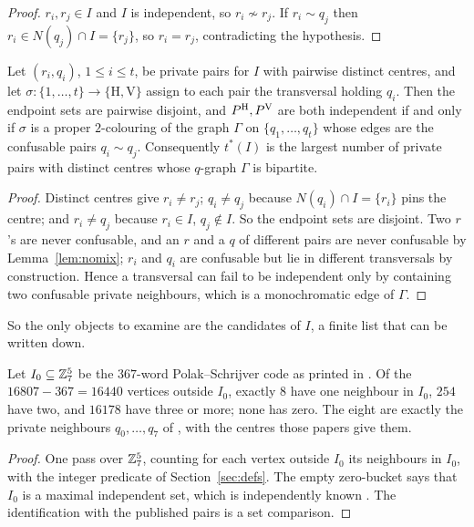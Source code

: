 \begin{proof}
$r_i,r_j\in I$ and $I$ is independent, so $r_i\not\sim r_j$. If $r_i\sim q_j$ then
$r_i\in N(q_j)\cap I=\{r_j\}$, so $r_i=r_j$, contradicting the hypothesis.
\end{proof}

\begin{corollary}[proved]
\label{cor:bip}
Let $(r_i,q_i)$, $1\le i\le t$, be private pairs for $I$ with pairwise distinct centres, and let
$\sigma:\{1,\dots,t\}\to\{\mathrm H,\mathrm V\}$ assign to each pair the transversal holding $q_i$.
Then the endpoint sets are pairwise disjoint, and $P^{\mathrm H},P^{\mathrm V}$ are both independent if and only if
$\sigma$ is a proper $2$-colouring of the graph $\Gamma$ on $\{q_1,\dots,q_t\}$ whose edges are the
confusable pairs $q_i\sim q_j$. Consequently $t^*(I)$ is the largest number of private pairs with
distinct centres whose $q$-graph $\Gamma$ is bipartite.
\end{corollary}

\begin{proof}
Distinct centres give $r_i\neq r_j$; $q_i\neq q_j$ because $N(q_i)\cap I=\{r_i\}$ pins the centre;
and $r_i\neq q_j$ because $r_i\in I$, $q_j\notin I$. So the endpoint sets are disjoint. Two $r$'s are
never confusable, and an $r$ and a $q$ of different pairs are never confusable by
Lemma~\ref{lem:nomix}; $r_i$ and $q_i$ are confusable but lie in different transversals by
construction. Hence a transversal can fail to be independent only by containing two confusable
private neighbours, which is a monochromatic edge of $\Gamma$.
\end{proof}

So the only objects to examine are the candidates of $I$, a finite list that can be written down.

\begin{proposition}
\label{prop:count}
Let $I_0\subseteq\mathbb{Z}_7^5$ be the $367$-word Polak--Schrijver code as printed in \cite{polak2019}. Of the
$16807-367=16440$ vertices outside $I_0$, exactly $8$ have one neighbour in $I_0$, $254$ have two,
and $16178$ have three or more; none has zero. The eight are exactly the private neighbours
$q_0,\dots,q_7$ of \cite{itty2026,gao2026}, with the centres those papers give them.
\end{proposition}

\begin{proof}
One pass over $\mathbb{Z}_7^5$, counting for each vertex outside $I_0$ its neighbours in $I_0$, with the integer
predicate of Section~\ref{sec:defs}. The empty zero-bucket says that $I_0$ is a maximal independent
set, which is independently known \cite{polak2019}. The identification with the published pairs is a
set comparison.
\end{proof}

